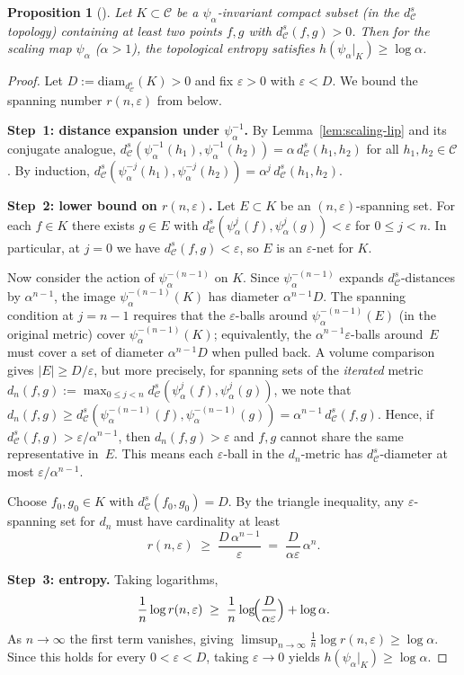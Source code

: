 \documentclass[11pt,a4paper]{article}
\theoremstyle{plain}
\newtheorem{propositioninner}[theoreminner]{Proposition}
\theoremstyle{definition}
\newenvironment{proposition}[1][]{\begin{propositioninner}[#1]}{\end{propositioninner}}
\newcommand{\C}{\mathcal{C}}
\newcommand{\eps}{\varepsilon}
\begin{document}
\begin{proposition}\label{prop:entropy-bound}
Let $K\subset\C$ be a $\psi_\alpha$-invariant compact subset (in
the $d_\C^s$ topology) containing at least two points $f,g$ with
$d_\C^s(f,g)>0$.  Then for the scaling map $\psi_\alpha$
($\alpha>1$), the topological entropy satisfies
$h(\psi_\alpha|_K)\ge\log\alpha$.
\end{proposition}

\begin{proof}
Let $D:=\mathrm{diam}_{d_\C^s}(K)>0$ and fix $\eps>0$ with
$\eps<D$.  We bound the spanning number $r(n,\eps)$ from below.

\textbf{Step~1: distance expansion under $\psi_\alpha^{-1}$.}
By Lemma~\ref{lem:scaling-lip} and its conjugate analogue,
$d_\C^s(\psi_\alpha^{-1}(h_1),\psi_\alpha^{-1}(h_2))
=\alpha\,d_\C^s(h_1,h_2)$ for all $h_1,h_2\in\C$.
By induction, $d_\C^s(\psi_\alpha^{-j}(h_1),\psi_\alpha^{-j}(h_2))
=\alpha^j\,d_\C^s(h_1,h_2)$.

\textbf{Step~2: lower bound on $r(n,\eps)$.}
Let $E\subset K$ be an $(n,\eps)$-spanning set.
For each $f\in K$ there exists $g\in E$ with
$d_\C^s(\psi_\alpha^j(f),\psi_\alpha^j(g))<\eps$ for
$0\le j<n$.  In particular, at $j=0$ we have
$d_\C^s(f,g)<\eps$, so $E$ is an $\eps$-net for $K$.

Now consider the action of $\psi_\alpha^{-(n-1)}$ on $K$.
Since $\psi_\alpha^{-(n-1)}$ expands $d_\C^s$-distances by
$\alpha^{n-1}$, the image $\psi_\alpha^{-(n-1)}(K)$ has diameter
$\alpha^{n-1}D$.  The spanning condition at $j=n-1$ requires that
the $\eps$-balls around $\psi_\alpha^{-(n-1)}(E)$ (in the
original metric) cover $\psi_\alpha^{-(n-1)}(K)$; equivalently,
the $\alpha^{n-1}\eps$-balls around~$E$ must cover a set of
diameter $\alpha^{n-1}D$ when pulled back.  A volume comparison
gives $|E|\ge D/\eps$, but more precisely, for spanning sets of
the \emph{iterated} metric
$d_n(f,g):=\max_{0\le j<n}d_\C^s(\psi_\alpha^j(f),\psi_\alpha^j(g))$,
we note that $d_n(f,g)\ge d_\C^s(\psi_\alpha^{-(n-1)}(f),
\psi_\alpha^{-(n-1)}(g))=\alpha^{n-1}\,d_\C^s(f,g)$.
Hence, if $d_\C^s(f,g)>\eps/\alpha^{n-1}$, then $d_n(f,g)>\eps$
and $f,g$ cannot share the same representative in~$E$.
This means each $\eps$-ball in the $d_n$-metric has
$d_\C^s$-diameter at most $\eps/\alpha^{n-1}$.

Choose $f_0,g_0\in K$ with $d_\C^s(f_0,g_0)=D$.  By
the triangle inequality, any $\eps$-spanning set for $d_n$ must
have cardinality at least
\[
  r(n,\eps) \;\ge\; \frac{D\,\alpha^{n-1}}{\eps}
  \;=\; \frac{D}{\alpha\eps}\,\alpha^n.
\]

\textbf{Step~3: entropy.}
Taking logarithms,
\[
  \frac{1}{n}\log r(n,\eps)
  \;\ge\; \frac{1}{n}\log\!\Bigl(\frac{D}{\alpha\eps}\Bigr)
    + \log\alpha.
\]
As $n\to\infty$ the first term vanishes, giving
$\limsup_{n\to\infty}\frac{1}{n}\log r(n,\eps)\ge\log\alpha$.
Since this holds for every $0<\eps<D$, taking $\eps\to 0$
yields $h(\psi_\alpha|_K)\ge\log\alpha$.
\end{proof}
\end{document}
